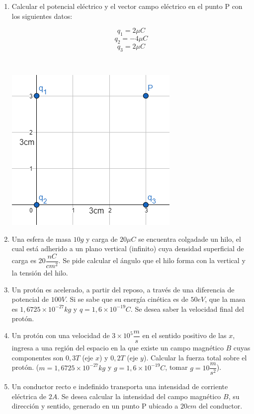 \documentclass[9pt,a4paper]{extarticle}
\begin{document}
\begin{enumerate}
    \item Calcular el potencial eléctrico y el vector campo eléctrico en el punto P con los siguientes datos: \\[0.6cm]
    \begin{minipage}{0.4\textwidth}
\begin{flushright} 
$$q_1=2\mu C$$
$$q_2=-4\mu C$$
$$q_3=2 \mu C$$
\end{flushright}
\end{minipage}
~
\begin{minipage}{0.4\textwidth}
\begin{flushleft} 
    \includegraphics[scale=0.3]{punto1.png}
\end{flushleft}
\end{minipage}

    \item Una esfera de masa $10 g$ y carga de $20\mu C$ se encuentra colgadade un hilo, el cual está adherido a un plano vertical (infinito) cuya densidad superficial de carga es $20\dfrac{nC}{cm^2}$. Se pide calcular el ángulo  que el hilo forma con la vertical y la tensión del hilo.
    \item Un protón es acelerado, a partir del reposo, a través de una diferencia de potencial de $100V$. Si se sabe que su energía cinética es de $50 eV$, que la masa es $1,6725 \times 10^{-27} kg$ y $q=1,6 \times 10^{-19} C$. Se desea saber la velocidad final del protón.
    \item Un protón con una velocidad de $3\times10^5 \dfrac{m}{s}$ en el sentido positivo de las $x$, ingresa a una región del espacio en la que existe un campo magnético $B$ cuyas componentes son $0,3 T$ (eje $x$) y $0,2 T$ (eje $y$). Calcular la fuerza total sobre el protón. ($m = 1,6725 \times 10^{-27}kg$ y $g = 1,6 \times 10^{-19} C$, tomar $g=10\dfrac{m}{s^2}$).
    \item Un conductor recto e indefinido transporta una intensidad de corriente eléctrica de $2A$. Se desea calcular la intensidad del campo magnético $B$, su dirección y sentido, generado en un punto P ubicado a $20 cm$ del conductor.
    
\end{enumerate}
\end{document}
